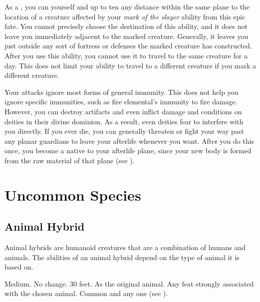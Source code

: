              As a , you can  yourself and up to ten  any distance within the same plane to the location of a creature affected by your \textit{mark of the slayer} ability from this epic fate.
            You cannot precisely choose the destination of this ability, and it does not leave you immediately adjacent to the marked creature.
            Generally, it leaves you just outside any sort of fortress or defenses the marked creature has constructed.
            After you use this ability, you cannot use it to travel to the same creature for a day.
            This does not limit your ability to travel to a different creature if you mark a different creature.

            Your attacks ignore most forms of general immunity.
            This does not help you ignore specific immunities, such as fire elemental's immunity to fire damage.
            However, you can destroy artifacts and even inflict damage and conditions on deities in their divine dominion.
            As a result, even deities fear to interfere with you directly.
            If you ever die, you can generally threaten or fight your way past any planar guardians to leave your afterlife whenever you want.
            After you do this once, you become a  native to your afterlife plane, since your new body is formed from the raw material of that plane (see ).

\section{Uncommon Species}\label{Uncommon Species}

    \subsection{Animal Hybrid}
        Animal hybrids are humanoid creatures that are a combination of humans and animals.
        The abilities of an animal hybrid depend on the type of animal it is based on.

         Medium.
         No change.
         30 feet.
         As the original animal.
         Any feat strongly associated with the chosen animal.
         Common and any one  (see ).

